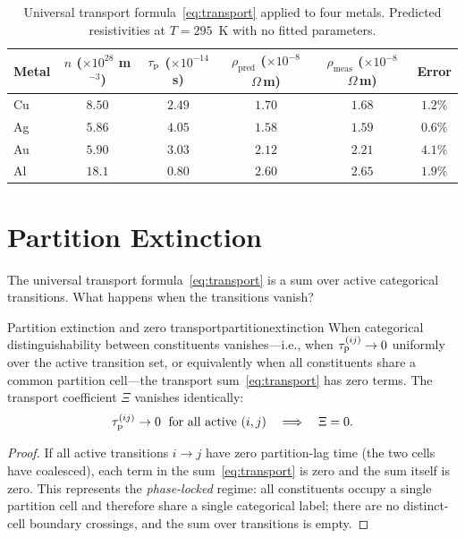 \begin{table}[!htbp]
\centering
\caption{Universal transport formula~\eqref{eq:transport} applied to four
metals.  Predicted resistivities at $T = 295$~K with no fitted parameters.}
\label{tab:transport}
\begin{tabular}{lccccc}
\toprule
Metal &
  $n$ ($\times 10^{28}$ m$^{-3}$) &
  $\tau_{\mathrm{p}}$ ($\times 10^{-14}$ s) &
  $\rho_{\mathrm{pred}}$ ($\times 10^{-8}$ $\Omega$\,m) &
  $\rho_{\mathrm{meas}}$ ($\times 10^{-8}$ $\Omega$\,m) &
  Error \\
\midrule
Cu & $8.50$ & $2.49$ & $1.70$ & $1.68$ & $1.2\%$ \\
Ag & $5.86$ & $4.05$ & $1.58$ & $1.59$ & $0.6\%$ \\
Au & $5.90$ & $3.03$ & $2.12$ & $2.21$ & $4.1\%$ \\
Al & $18.1$ & $0.80$ & $2.60$ & $2.65$ & $1.9\%$ \\
\bottomrule
\end{tabular}
\end{table}

\section{Partition Extinction}
\label{sec:partitionextinction}

The universal transport formula~\eqref{eq:transport} is a sum over active
categorical transitions.  What happens when the transitions vanish?

\begin{consequence}{Partition extinction and zero transport}{partitionextinction}
When categorical distinguishability between constituents vanishes---i.e.,
when $\tau_{\mathrm{p}}^{(ij)} \to 0$ uniformly over the active transition set, or
equivalently when all constituents share a common partition cell---the
transport sum~\eqref{eq:transport} has zero terms.  The transport
coefficient $\Xi$ vanishes identically:
\begin{equation}
  \tau_{\mathrm{p}}^{(ij)} \to 0 \;\text{ for all active } (i,j)
  \quad\Longrightarrow\quad
  \Xi = 0.
\end{equation}
\end{consequence}

\begin{proof}
If all active transitions $i \to j$ have zero partition-lag time (the two
cells have coalesced), each term in the sum~\eqref{eq:transport} is zero
and the sum itself is zero.  This represents the \emph{phase-locked} regime:
all constituents occupy a single partition cell and therefore share a single
categorical label; there are no distinct-cell boundary crossings, and the
sum over transitions is empty.
\end{proof}

